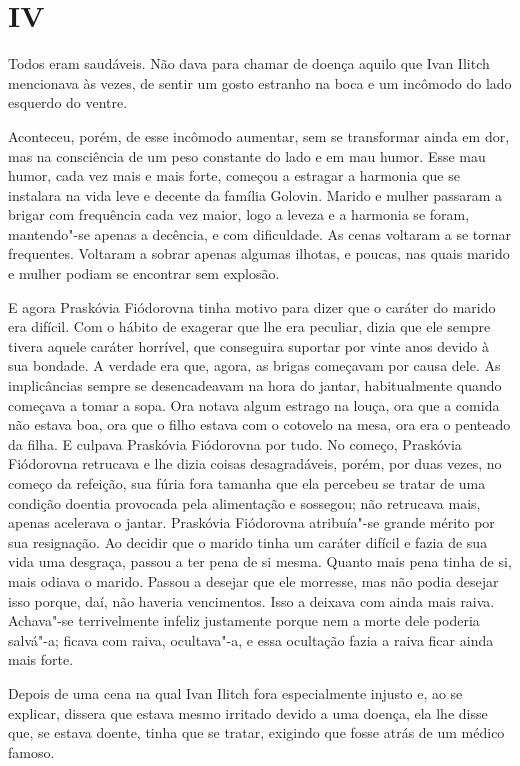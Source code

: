 \section{IV}

Todos eram saudáveis. Não dava para chamar de doença aquilo que Ivan
Ilitch mencionava às vezes, de sentir um gosto estranho na boca e um
incômodo do lado esquerdo do ventre.

Aconteceu, porém, de esse incômodo aumentar, sem se transformar ainda em
dor, mas na consciência de um peso constante do lado e em mau humor.
Esse mau humor, cada vez mais e mais forte, começou a estragar a
harmonia que se instalara na vida leve e decente da família Golovin.
Marido e mulher passaram a brigar com frequência cada vez maior, logo a
leveza e a harmonia se foram, mantendo"-se apenas a decência, e com
dificuldade. As cenas voltaram a se tornar frequentes. Voltaram a sobrar
apenas algumas ilhotas, e poucas, nas quais marido e mulher podiam se
encontrar sem explosão.

E agora Praskóvia Fiódorovna tinha motivo para dizer que o caráter do
marido era difícil. Com o hábito de exagerar que lhe era peculiar, dizia
que ele sempre tivera aquele caráter horrível, que conseguira suportar
por vinte anos devido à sua bondade. A verdade era que, agora, as brigas
começavam por causa dele. As implicâncias sempre se desencadeavam na
hora do jantar, habitualmente quando começava a tomar a sopa. Ora notava
algum estrago na louça, ora que a comida não estava boa, ora que o filho
estava com o cotovelo na mesa, ora era o penteado da filha. E culpava
Praskóvia Fiódorovna por tudo. No começo, Praskóvia Fiódorovna retrucava
e lhe dizia coisas desagradáveis, porém, por duas vezes, no começo da
refeição, sua fúria fora tamanha que ela percebeu se tratar de uma
condição doentia provocada pela alimentação e sossegou; não retrucava
mais, apenas acelerava o jantar. Praskóvia Fiódorovna atribuía"-se grande
mérito por sua resignação. Ao decidir que o marido tinha um caráter
difícil e fazia de sua vida uma desgraça, passou a ter pena de si mesma.
Quanto mais pena tinha de si, mais odiava o marido. Passou a desejar que
ele morresse, mas não podia desejar isso porque, daí, não haveria
vencimentos. Isso a deixava com ainda mais raiva. Achava"-se
terrivelmente infeliz justamente porque nem a morte dele poderia
salvá"-a; ficava com raiva, ocultava"-a, e essa ocultação fazia a raiva
ficar ainda mais forte.

Depois de uma cena na qual Ivan Ilitch fora especialmente injusto e, ao
se explicar, dissera que estava mesmo irritado devido a uma doença, ela
lhe disse que, se estava doente, tinha que se tratar, exigindo que fosse
atrás de um médico famoso.

